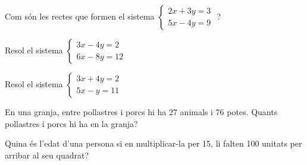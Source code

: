 \begin{autoaval}{40}
\begin{mylist}
\exer[2] Com són les rectes que formen el sistema $\left\{\begin{array}{c} {2x+3y=3} \\ {5x-4y=9} \end{array}\right. $ ?
\begin{comment}
\begin{tasks}(4)
	\task  Secants   
	\task  Paral·leles   
	\task  Coincidents  
	\task  Es creuen
\end{tasks}
\end{comment}

\exer[2] Resol el sistema $\left\{\begin{array}{c} {3x-4y=2} \\ {6x-8y=12} \end{array}\right. $ 
\begin{comment}
\begin{tasks}(4)
	\task  \textit{x} = 2 i \textit{y =} 1   
	\task  \textit{x} = 1 i \textit{y =} 1   
	\task  \textit{x} = 3 i \textit{y =} 2   
	\task  No té solució
\end{tasks}
\end{comment}

\exer[2] Resol el sistema $\left\{\begin{array}{c} {3x+4y=2} \\ {5x-y=11} \end{array}\right. $
\begin{comment}
\begin{tasks}(4)
	\task  \textit{x} = 4 i \textit{y =} 2   
	\task  \textit{x} = 3 i \textit{y =} 3   
	\task  \textit{x} = 2 i \textit{y =} $-$1   
	\task  \textit{x} = 5 i \textit{y =} 1
\end{tasks}
\end{comment}

\exer[2] En una granja, entre pollastres i porcs hi ha 27 animals i 76 potes. Quants pollastres i porcs hi ha en la granja?
\begin{comment}
\begin{tasks}(3)
	\task  16 pollastres i 11 porcs     
	\task  15 pollastres i 12 porcs        
	\task  13 pollastres i 14 porcs
\end{tasks}
\end{comment}

\exer[2] Quina és l'edat d'una persona si en multiplicar-la per 15, li falten 100 unitats per arribar al seu quadrat?
\begin{comment}
\begin{tasks}(4)
	\task  16 anys   
	\task  17 anys   
	\task  20 anys   
	\task  18 anys 
\end{tasks}
\end{comment}
 
\end{mylist}
\end{autoaval}


